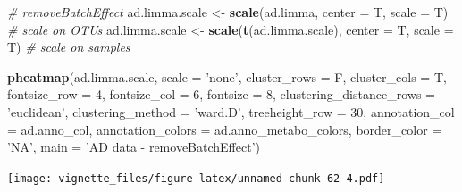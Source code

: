 \documentclass[]{book}
\newenvironment{Shaded}{\begin{snugshade}}{\end{snugshade}}
\newcommand{\KeywordTok}[1]{\textcolor[rgb]{0.13,0.29,0.53}{\textbf{#1}}}
\newcommand{\DataTypeTok}[1]{\textcolor[rgb]{0.13,0.29,0.53}{#1}}
\newcommand{\DecValTok}[1]{\textcolor[rgb]{0.00,0.00,0.81}{#1}}
\newcommand{\StringTok}[1]{\textcolor[rgb]{0.31,0.60,0.02}{#1}}
\newcommand{\CommentTok}[1]{\textcolor[rgb]{0.56,0.35,0.01}{\textit{#1}}}
\newcommand{\NormalTok}[1]{#1}
\begin{document}
\begin{Shaded}
\begin{Highlighting}[]
\CommentTok{# removeBatchEffect}
\NormalTok{ad.limma.scale <-}\StringTok{ }\KeywordTok{scale}\NormalTok{(ad.limma, }\DataTypeTok{center =}\NormalTok{ T, }\DataTypeTok{scale =}\NormalTok{ T) }\CommentTok{# scale on OTUs}
\NormalTok{ad.limma.scale <-}\StringTok{ }\KeywordTok{scale}\NormalTok{(}\KeywordTok{t}\NormalTok{(ad.limma.scale), }\DataTypeTok{center =}\NormalTok{ T, }\DataTypeTok{scale =}\NormalTok{ T) }\CommentTok{# scale on samples}

\KeywordTok{pheatmap}\NormalTok{(ad.limma.scale, }
         \DataTypeTok{scale =} \StringTok{'none'}\NormalTok{, }
         \DataTypeTok{cluster_rows =}\NormalTok{ F, }
         \DataTypeTok{cluster_cols =}\NormalTok{ T, }
         \DataTypeTok{fontsize_row =} \DecValTok{4}\NormalTok{, }\DataTypeTok{fontsize_col =} \DecValTok{6}\NormalTok{,}
         \DataTypeTok{fontsize =} \DecValTok{8}\NormalTok{,}
         \DataTypeTok{clustering_distance_rows =} \StringTok{'euclidean'}\NormalTok{,}
         \DataTypeTok{clustering_method =} \StringTok{'ward.D'}\NormalTok{,}
         \DataTypeTok{treeheight_row =} \DecValTok{30}\NormalTok{,}
         \DataTypeTok{annotation_col =}\NormalTok{ ad.anno_col,}
         \DataTypeTok{annotation_colors =}\NormalTok{ ad.anno_metabo_colors,}
         \DataTypeTok{border_color =} \StringTok{'NA'}\NormalTok{,}
         \DataTypeTok{main =} \StringTok{'AD data - removeBatchEffect'}\NormalTok{)}
\end{Highlighting}
\end{Shaded}

\texttt{[image: vignette\_files/figure-latex/unnamed-chunk-62-4.pdf]}
\end{document}
